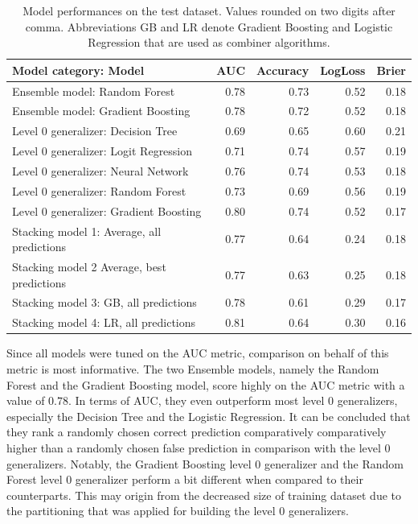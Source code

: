 \documentclass[12pt]{article}
\begin{document}
\begin{table}[ht]
\centering
\begin{tabular}{lrrrr}
  \hline
 Model category: Model & AUC & Accuracy & LogLoss & Brier\\ 
  \hline
Ensemble model: Random Forest & 0.78 & 0.73 & 0.52 & 0.18 \\ 
Ensemble model: Gradient Boosting & 0.78 & 0.72 & 0.52 & 0.18 \\
\hline 
  Level 0 generalizer: Decision Tree & 0.69 & 0.65 & 0.60 & 0.21 \\ 
  Level 0 generalizer: Logit Regression & 0.71 & 0.74 & 0.57 & 0.19 \\ 
  Level 0 generalizer: Neural Network & 0.76 & 0.74 & 0.53 & 0.18 \\ 
  Level 0 generalizer: Random Forest & 0.73 & 0.69 & 0.56 & 0.19 \\ 
  Level 0 generalizer: Gradient Boosting & 0.80 & 0.74 & 0.52 & 0.17 \\ 
\hline
  Stacking model 1: Average, all predictions & 0.77 & 0.64 & 0.24 & 0.18 \\ 
  Stacking model 2 Average, best predictions & 0.77 & 0.63 & 0.25 & 0.18 \\ 
  Stacking model 3: GB, all predictions & 0.78 & 0.61 & 0.29 & 0.17 \\ 
  Stacking model 4: LR, all predictions & 0.81 & 0.64 & 0.30 & 0.16 \\ 
   \hline
\end{tabular}
\caption[Model performances on the test dataset]{Model performances on the test dataset. Values rounded on two digits after comma. Abbreviations GB and LR denote Gradient Boosting and Logistic Regression that are used as combiner algorithms.}\label{eval}
\end{table}

\noindent Since all models were tuned on the AUC metric, comparison on behalf of this metric is most informative. The two Ensemble models, namely the Random Forest and the Gradient Boosting model, score highly on the AUC metric with a value of $0.78$. In terms of AUC, they even outperform most level 0 generalizers, especially the Decision Tree and the Logistic Regression. It can be concluded that they rank a randomly chosen correct prediction comparatively comparatively higher than a randomly chosen false prediction in comparison with the level 0 generalizers. Notably, the Gradient Boosting level 0 generalizer and the Random Forest level 0 generalizer perform a bit different when compared to their counterparts. This may origin from the decreased size of training dataset due to the partitioning that was applied for building the level 0 generalizers. 
\end{document}

